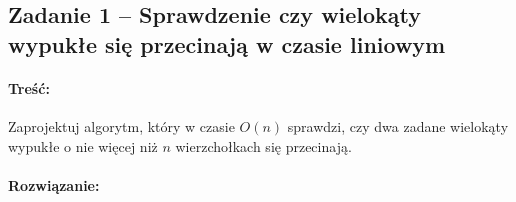 \subsection{Zadanie 1 -- Sprawdzenie czy wielokąty wypukłe się przecinają w czasie liniowym} 
\paragraph{Treść:} Zaprojektuj algorytm, który w 
czasie $O(n)$ sprawdzi, czy dwa zadane wielokąty wypukłe o nie więcej
niż $n$ wierzchołkach się przecinają.

\paragraph{Rozwiązanie:}


